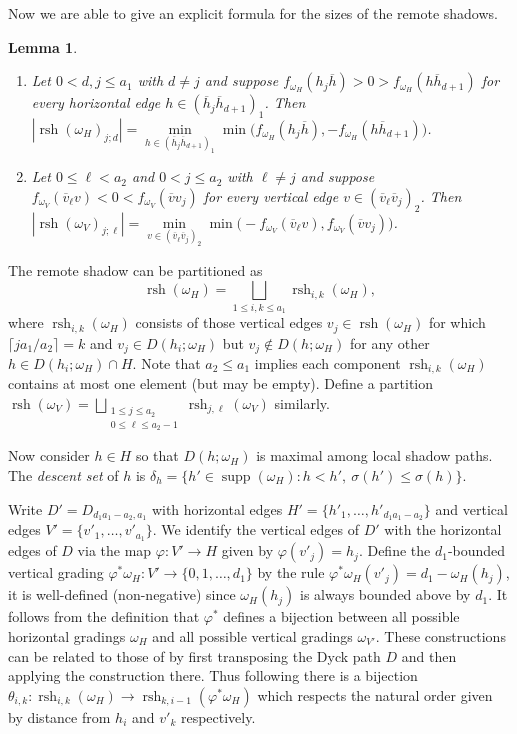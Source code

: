 \documentclass{amsart}
\newtheorem{lemma}[theorem]{Lemma}
\newcommand{\supp}{\operatorname{supp}}
\newcommand{\rsh}{\operatorname{rsh}}
\newenvironment{enumeratea}{\begin{enumerate}[\upshape (a)]}
                           {\end{enumerate}}
\begin{document}
 Now we are able to give an explicit formula for the sizes of the remote shadows.
 \begin{lemma}\label{le:remote_shadow_sizes}\mbox{}
  \begin{enumeratea}
   \item Let $0<d,j\le a_1$ with $d\ne j$ and suppose $f_{\omega_H}(h_j\overline{h})>0>f_{\omega_H}(h\overline{h}_{d+1})$ for every horizontal edge $h\in (\overline{h}_j\overline{h}_{d+1})_1$.  Then $|\rsh(\omega_H)_{j;d}|=\min\limits_{h\in (\overline{h}_j\overline{h}_{d+1})_1}\min\big(f_{\omega_H}(h_j\overline{h}),-f_{\omega_H}(h\overline{h}_{d+1})\big)$.
   \item Let $0\le\ell< a_2$ and $0<j\le a_2$ with $\ell\ne j$ and suppose $f_{\omega_V}(\overline{v}_\ell v)<0<f_{\omega_V}(\overline{v}v_j)$ for every vertical edge $v\in (\overline{v}_\ell\overline{v}_j)_2$.  Then $|\rsh(\omega_V)_{j;\ell}|=\min\limits_{v\in (\overline{v}_\ell\overline{v}_j)_2}\min\big(-f_{\omega_V}(\overline{v}_\ell v),f_{\omega_V}(\overline{v}v_j)\big)$.
  \end{enumeratea}
 \end{lemma}

The remote shadow can be partitioned as 
\[\rsh(\omega_H)=\bigsqcup\limits_{1\le i,k\le a_1}\rsh_{i,k}(\omega_H),\] 
where $\rsh_{i,k}(\omega_H)$ consists of those vertical edges $v_j\in\rsh(\omega_H)$ for which $\lceil ja_1/a_2\rceil=k$ and $v_j\in D(h_i;\omega_H)$ but $v_j\notin D(h;\omega_H)$ for any other $h\in D(h_i;\omega_H)\cap H$.  Note that $a_2\le a_1$ implies each component $\rsh_{i,k}(\omega_H)$ contains at most one element (but may be empty).  Define a partition $\rsh(\omega_V)=\bigsqcup\limits_{\substack{1\le j\le a_2\\0\le\ell\le a_2-1}}\rsh_{j,\ell}(\omega_V)$ similarly.  

Now consider $h\in H$ so that $D(h;\omega_H)$ is maximal among local shadow paths.  The \emph{descent set} of $h$ is $\delta_h=\{h'\in\supp(\omega_H):h<h',\ \sigma(h')\le\sigma(h)\}$.  


 

Write $D'=D_{d_1a_1-a_2,a_1}$ with horizontal edges $H'=\{h'_1,\ldots,h'_{d_1a_1-a_2}\}$ and vertical edges $V'=\{v'_1,\ldots,v'_{a_1}\}$.  We identify the vertical edges of $D'$ with the horizontal edges of $D$ via the map $\varphi:V'\to H$ given by $\varphi(v'_j)=h_j$.  Define the $d_1$-bounded vertical grading $\varphi^*\omega_H:V'\to\{0,1,\ldots,d_1\}$ by the rule $\varphi^*\omega_H(v'_j)=d_1-\omega_H(h_j)$, it is well-defined (non-negative) since $\omega_H(h_j)$ is always bounded above by $d_1$.  It follows from the definition that $\varphi^*$ defines a bijection between all possible horizontal gradings $\omega_H$ and all possible vertical gradings $\omega_{V'}$.  These constructions can be related to those of \cite[Section 4.2]{rupel2} by first transposing the Dyck path $D$ and then applying the construction there.  Thus following \cite[Corollary 4.18]{rupel2} there is a bijection $\theta_{i,k}:\rsh_{i,k}(\omega_H)\to\rsh_{k,i-1}(\varphi^*\omega_H)$ which respects the natural order given by distance from $h_i$ and $v'_k$ respectively.
\end{document}
